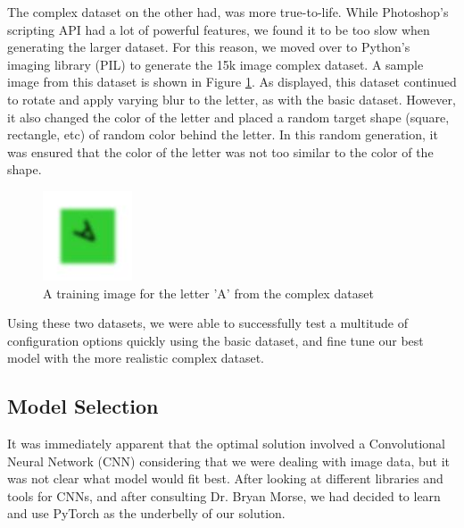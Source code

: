 \documentclass{article}
\begin{document}
The complex dataset on the other had, was more true-to-life. While Photoshop’s scripting API had a lot 
of powerful features, we found it to be too slow when generating the larger dataset. For this reason, 
we moved over to Python’s imaging library (PIL) to generate the 15k image complex dataset. A sample image 
from this dataset is shown in Figure \ref{fig:complexDataset}. As displayed, this dataset continued to rotate and apply varying 
blur to the letter, as with the basic dataset. However, it also changed the color of the letter and placed 
a random target shape (square, rectangle, etc) of random color behind the letter. In this random generation, 
it was ensured that the color of the letter was not too similar to the color of the shape.

\begin{figure}[H]
  \begin{center}
  \includegraphics[width=0.7\linewidth]{./figs/complexDatasetSample.jpeg}
  \caption{A training image for the letter 'A' from the complex dataset}
  \label{fig:complexDataset}
  \end{center}
\end{figure}

Using these two datasets, we were able to successfully test a multitude of configuration options quickly 
using the basic dataset, and fine tune our best model with the more realistic complex dataset.

\subsection{Model Selection}

It was immediately apparent that the optimal solution involved a Convolutional Neural Network (CNN) 
considering that we were dealing with image data, but it was not clear what model would fit best. After 
looking at different libraries and tools for CNNs, and after consulting Dr. Bryan Morse, we had decided 
to learn and use PyTorch as the underbelly of our solution. 
\end{document}
